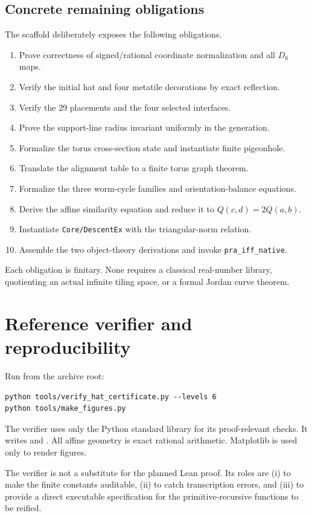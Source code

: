 \documentclass[11pt]{article}
\begin{document}
\subsection{Concrete remaining obligations}
The scaffold deliberately exposes the following obligations.
\begin{enumerate}[label=\textbf{L\arabic*.}]
\item Prove correctness of signed/rational coordinate normalization and all $D_6$ maps.
\item Verify the initial hat and four metatile decorations by exact reflection.
\item Verify the 29 placements and the four selected interfaces.
\item Prove the support-line radius invariant uniformly in the generation.
\item Formalize the torus cross-section state and instantiate finite pigeonhole.
\item Translate the alignment table to a finite torus graph theorem.
\item Formalize the three worm-cycle families and orientation-balance equations.
\item Derive the affine similarity equation and reduce it to $Q(c,d)=2Q(a,b)$.
\item Instantiate \texttt{Core/DescentEx} with the triangular-norm relation.
\item Assemble the two object-theory derivations and invoke
\texttt{pra\_iff\_native}.
\end{enumerate}
Each obligation is finitary.  None requires a classical real-number library, quotienting
an actual infinite tiling space, or a formal Jordan curve theorem.

\section{Reference verifier and reproducibility}
Run from the archive root:
\begin{lstlisting}
python tools/verify_hat_certificate.py --levels 6
python tools/make_figures.py
\end{lstlisting}
The verifier uses only the Python standard library for its proof-relevant checks.  It
writes  and
.  All affine geometry is exact rational
arithmetic.  Matplotlib is used only to render figures.

The verifier is not a substitute for the planned Lean proof.  Its roles are (i) to make
the finite constants auditable, (ii) to catch transcription errors, and (iii) to provide
a direct executable specification for the primitive-recursive functions to be reified.
\end{document}
